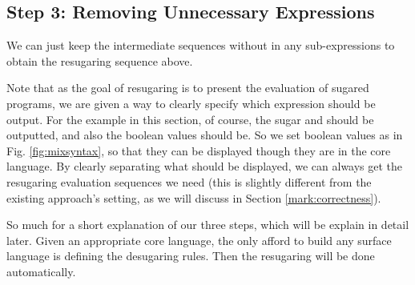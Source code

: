 \subsection*{Step 3: Removing Unnecessary Expressions}
We can just keep the intermediate sequences without  in any sub-expressions to obtain the resugaring sequence above.



Note that as the goal of resugaring is to present the evaluation of sugared programs, we are given a way to clearly specify which expression should be output. For the example in this section, of course, the sugar  and  should be outputted, and also the boolean values should be. So we set boolean values as  in Fig. \ref{fig:mixsyntax}, so that they can be displayed though they are in the core language. By clearly separating what should be displayed, we can always get the resugaring evaluation sequences we need (this is slightly different from the existing approach's setting, as we will discuss in Section \ref{mark:correctness}).


\medskip

So much for a short explanation of our three steps, which will be explain in detail later. Given an appropriate core language, the only afford to build any surface language is defining the desugaring rules. Then the resugaring will be done automatically.
